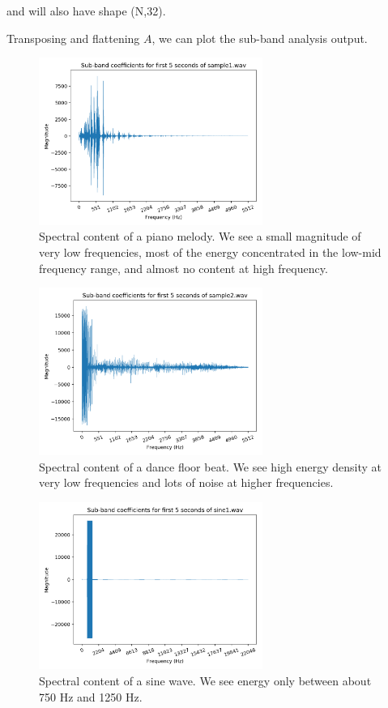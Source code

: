 \documentclass[11pt,a4paper]{article}
\begin{document}
and will also have shape (N,32).

Transposing and flattening $A$, we can plot the sub-band analysis output.

\clearpage

\begin{figure}[ht]
	\centering
	\includegraphics[width=0.65\textwidth]{analysis/sample1}
	\caption{Spectral content of a piano melody. We see a small magnitude of very low frequencies, most of the energy concentrated in the low-mid frequency range, and almost no content at high frequency.}
	\label{fig:analysis_sample1}
\end{figure}

\begin{figure}[ht]
	\centering
	\includegraphics[width=0.65\textwidth]{analysis/sample2}
	\caption{Spectral content of a dance floor beat. We see high energy density at very low frequencies and lots of noise at higher frequencies.}
	\label{fig:analysis_sample2}
\end{figure}

\clearpage

\begin{figure}[ht]
	\centering
	\includegraphics[width=0.65\textwidth]{analysis/sine1}
	\caption{Spectral content of a sine wave. We see energy only between about 750 Hz and 1250 Hz.}
	\label{fig:analysis_sine1}
\end{figure}
\end{document}
